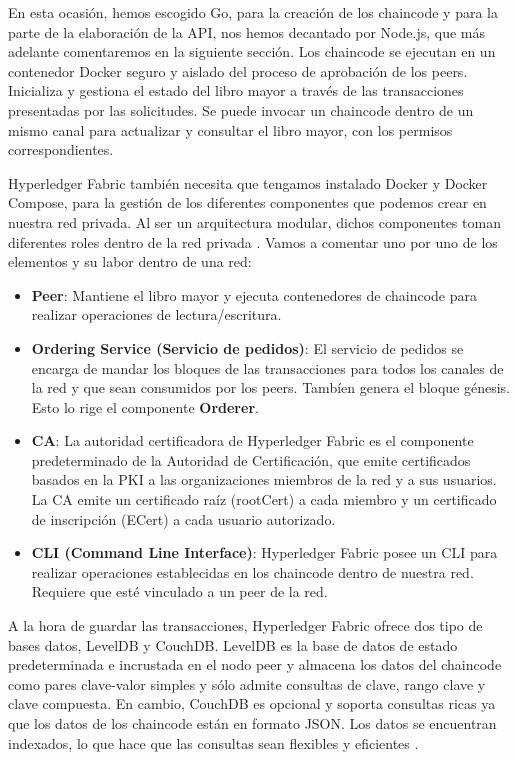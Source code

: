 \vspace{5mm}

\noindent En esta ocasión, hemos escogido Go, para la creación de los chaincode y para la parte de la elaboración
de la API, nos hemos decantado por Node.js, que más adelante comentaremos en la siguiente sección. Los chaincode 
se ejecutan en un contenedor Docker seguro y aislado del proceso de aprobación de los peers. Inicializa y gestiona 
el estado del libro mayor a través de las transacciones presentadas por las solicitudes. Se puede invocar un 
chaincode dentro de un mismo canal para actualizar y consultar el libro mayor, con los permisos correspondientes.

\vspace{5mm}

\noindent Hyperledger Fabric también necesita que tengamos instalado Docker y Docker Compose, para la gestión de los 
diferentes componentes que podemos crear en nuestra red privada. Al ser un arquitectura modular, dichos componentes 
toman diferentes roles dentro de la red privada \cite{hyperledger-fabric-docs}. Vamos a comentar uno por uno de los 
elementos y su labor dentro de una red:

\begin{itemize}
    \item \textbf{Peer}: Mantiene el libro mayor y ejecuta contenedores de chaincode para realizar operaciones de 
    lectura/escritura.
    \item \textbf{Ordering Service (Servicio de pedidos)}: El servicio de pedidos se encarga de mandar los bloques de 
    las transacciones para todos los canales de la red y que sean consumidos por los peers. Tambíen genera el bloque 
    génesis. Esto lo rige el componente \textbf{Orderer}.
    \item \textbf{CA}: La autoridad certificadora de Hyperledger Fabric es el componente predeterminado de la 
    Autoridad de Certificación, que emite certificados basados en la PKI a las organizaciones miembros de la red y a 
    sus usuarios. La CA emite un certificado raíz (rootCert) a cada miembro y un certificado de inscripción (ECert) a 
    cada usuario autorizado.
    \item \textbf{CLI (Command Line Interface)}: Hyperledger Fabric posee un CLI para realizar operaciones establecidas 
    en los chaincode dentro de nuestra red. Requiere que esté vinculado a un peer de la red.
\end{itemize}

\noindent A la hora de guardar las transacciones, Hyperledger Fabric ofrece dos tipo de bases datos, LevelDB y CouchDB. 
LevelDB es la base de datos de estado predeterminada e incrustada en el nodo peer y almacena los datos del chaincode 
como pares clave-valor simples y sólo admite consultas de clave, rango clave y clave compuesta. En cambio, CouchDB es 
opcional y soporta consultas ricas ya que los datos de los chaincode están en formato JSON. Los datos se encuentran 
indexados, lo que hace que las consultas sean flexibles y eficientes \cite{using-couchdb}.

